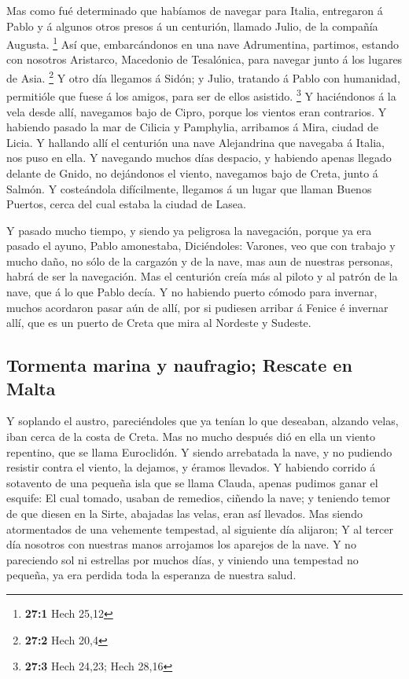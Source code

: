  Mas como fué determinado que habíamos de navegar para
Italia, entregaron á Pablo y á algunos otros presos á un centurión,
llamado Julio, de la compañía Augusta. \footnote{\textbf{27:1} Hech
  25,12}  Así que, embarcándonos en una nave Adrumentina,
partimos, estando con nosotros Aristarco, Macedonio de Tesalónica, para
navegar junto á los lugares de Asia. \footnote{\textbf{27:2} Hech 20,4}
 Y otro día llegamos á Sidón; y Julio, tratando á Pablo
con humanidad, permitióle que fuese á los amigos, para ser de ellos
asistido. \footnote{\textbf{27:3} Hech 24,23; Hech 28,16} 
Y haciéndonos á la vela desde allí, navegamos bajo de Cipro, porque los
vientos eran contrarios.  Y habiendo pasado la mar de
Cilicia y Pamphylia, arribamos á Mira, ciudad de Licia.  Y
hallando allí el centurión una nave Alejandrina que navegaba á Italia,
nos puso en ella.  Y navegando muchos días despacio, y
habiendo apenas llegado delante de Gnido, no dejándonos el viento,
navegamos bajo de Creta, junto á Salmón.  Y costeándola
difícilmente, llegamos á un lugar que llaman Buenos Puertos, cerca del
cual estaba la ciudad de Lasea.

 Y pasado mucho tiempo, y siendo ya peligrosa la
navegación, porque ya era pasado el ayuno, Pablo amonestaba,
 Diciéndoles: Varones, veo que con trabajo y mucho daño,
no sólo de la cargazón y de la nave, mas aun de nuestras personas, habrá
de ser la navegación.  Mas el centurión creía más al
piloto y al patrón de la nave, que á lo que Pablo decía. 
Y no habiendo puerto cómodo para invernar, muchos acordaron pasar aún de
allí, por si pudiesen arribar á Fenice é invernar allí, que es un puerto
de Creta que mira al Nordeste y Sudeste.

\hypertarget{tormenta-marina-y-naufragio-rescate-en-malta}{%
\subsection{Tormenta marina y naufragio; Rescate en
Malta}\label{tormenta-marina-y-naufragio-rescate-en-malta}}

 Y soplando el austro, pareciéndoles que ya tenían lo que
deseaban, alzando velas, iban cerca de la costa de Creta.
 Mas no mucho después dió en ella un viento repentino,
que se llama Euroclidón.  Y siendo arrebatada la nave, y
no pudiendo resistir contra el viento, la dejamos, y éramos llevados.
 Y habiendo corrido á sotavento de una pequeña isla que
se llama Clauda, apenas pudimos ganar el esquife:  El
cual tomado, usaban de remedios, ciñendo la nave; y teniendo temor de
que diesen en la Sirte, abajadas las velas, eran así llevados.
 Mas siendo atormentados de una vehemente tempestad, al
siguiente día alijaron;  Y al tercer día nosotros con
nuestras manos arrojamos los aparejos de la nave.  Y no
pareciendo sol ni estrellas por muchos días, y viniendo una tempestad no
pequeña, ya era perdida toda la esperanza de nuestra salud.

